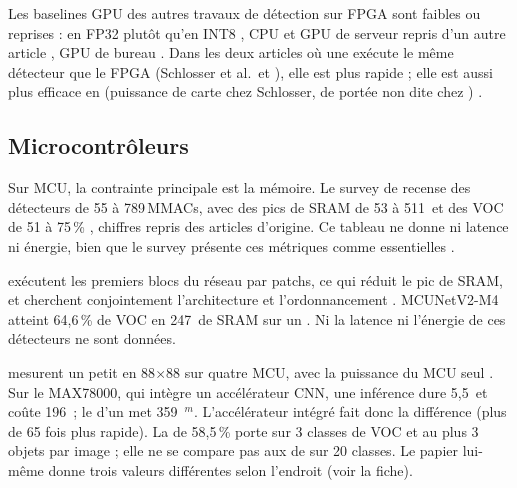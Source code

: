 Les baselines GPU des autres travaux de détection sur FPGA sont faibles ou reprises :
 en FP32 plutôt qu'en INT8
\citep[§5.3]{2024-zhang-end-end-acceleration-yolo-object}, CPU et GPU de serveur repris
d'un autre article \citep[Table~3]{2024-yan-fpga-yolov5-accelerator-real-time}, GPU de
bureau \citep[Table~10]{2026-fata-low-cost-fpga-enhanced-cnn}. Dans les deux articles où une
 exécute le même détecteur que le FPGA (Schlosser et al.\ et ), elle est plus
rapide ; elle est aussi plus efficace en  (puissance de carte chez Schlosser, de
portée non dite chez ) \deduit.

\subsection{Microcontrôleurs}

Sur MCU, la contrainte principale est la mémoire. Le survey de
\citet{2025-el-zeinaty-designing-object-detection-models-tinyml} recense des détecteurs de
55 à 789\,MMACs, avec des pics de SRAM de 53 à 511\, et des  VOC de 51 à 75\,\%
, chiffres repris des articles d'origine. Ce tableau ne donne ni latence ni
énergie, bien que le survey présente ces métriques comme essentielles .

\citet{arxiv-2110.15352-mcunetv2-memory-efficient-patch-inference} exécutent les premiers
blocs du réseau par patchs, ce qui réduit le pic de SRAM, et cherchent conjointement
l'architecture et l'ordonnancement . MCUNetV2-M4 atteint 64,6\,\% de  VOC en
247\, de SRAM sur un  . Ni la latence ni l'énergie de ces
détecteurs ne sont données.

\citet{arxiv-2306.00001-tinyissimoyolo-quantized-low-memory-footprint} mesurent un petit
 en 88$\times$88 sur quatre MCU, avec la puissance du MCU seul . Sur le
MAX78000, qui intègre un accélérateur CNN, une inférence dure 5,5\, et coûte 196\, ; le
 d'un  met 359\, $^{m}$. L'accélérateur intégré fait
donc la différence (plus de 65 fois plus rapide). La  de 58,5\,\% porte sur 3 classes
de VOC et au plus 3 objets par image  ; elle ne se compare pas aux 
de  sur 20 classes. Le papier lui-même donne trois valeurs différentes selon
l'endroit (voir la fiche).

